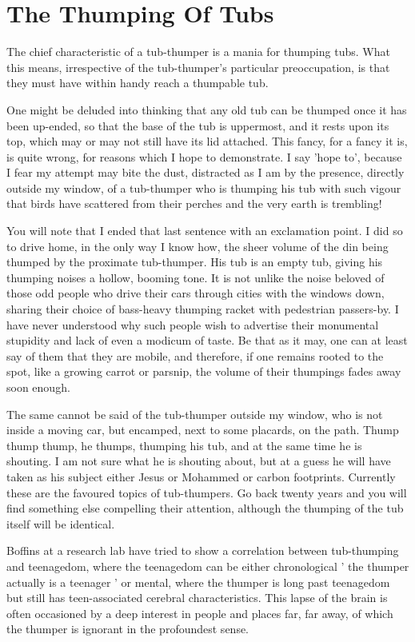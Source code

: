 \chapter{The Thumping Of Tubs}

The chief characteristic of a tub-thumper is a mania for thumping tubs. What this means, irrespective of the tub-thumper's particular preoccupation, is that they must have within handy reach a thumpable tub.

One might be deluded into thinking that any old tub can be thumped once it has been up-ended, so that the base of the tub is uppermost, and it rests upon its top, which may or may not still have its lid attached. This fancy, for a fancy it is, is quite wrong, for reasons which I hope to demonstrate. I say 'hope to', because I fear my attempt may bite the dust, distracted as I am by the presence, directly outside my window, of a tub-thumper who is thumping his tub with such vigour that birds have scattered from their perches and the very earth is trembling!

You will note that I ended that last sentence with an exclamation point. I did so to drive home, in the only way I know how, the sheer volume of the din being thumped by the proximate tub-thumper. His tub is an empty tub, giving his thumping noises a hollow, booming tone. It is not unlike the noise beloved of those odd people who drive their cars through cities with the windows down, sharing their choice of bass-heavy thumping racket with pedestrian passers-by. I have never understood why such people wish to advertise their monumental stupidity and lack of even a modicum of taste. Be that as it may, one can at least say of them that they are mobile, and therefore, if one remains rooted to the spot, like a growing carrot or parsnip, the volume of their thumpings fades away soon enough.

The same cannot be said of the tub-thumper outside my window, who is not inside a moving car, but encamped, next to some placards, on the path. Thump thump thump, he thumps, thumping his tub, and at the same time he is shouting. I am not sure what he is shouting about, but at a guess he will have taken as his subject either Jesus or Mohammed or carbon footprints. Currently these are the favoured topics of tub-thumpers. Go back twenty years and you will find something else compelling their attention, although the thumping of the tub itself will be identical.

Boffins at a research lab have tried to show a correlation between tub-thumping and teenagedom, where the teenagedom can be either chronological ' the thumper actually is a teenager ' or mental, where the thumper is long past teenagedom but still has teen-associated cerebral characteristics. This lapse of the brain is often occasioned by a deep interest in people and places far, far away, of which the thumper is ignorant in the profoundest sense.

